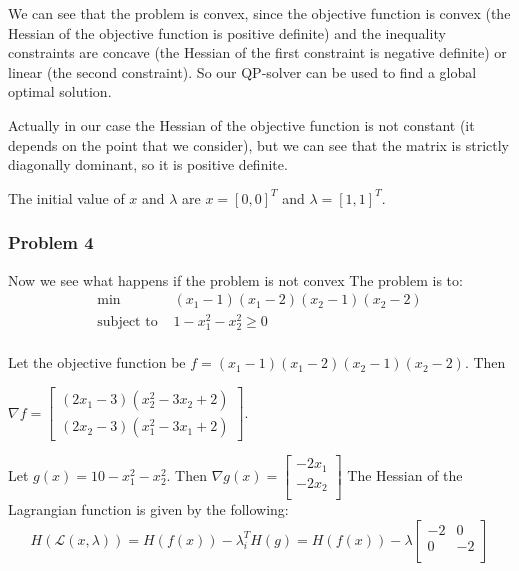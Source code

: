\documentclass{article}
\begin{document}
We can see that the problem is convex, since the objective function is convex (the Hessian of the objective function is positive definite) and the inequality constraints are concave (the Hessian of the first constraint is negative definite) or linear (the second constraint). So our QP-solver can be used to find a global optimal solution.

Actually in our case the Hessian of the objective function is not constant (it depends on the point that we consider), but we can see that the matrix is strictly diagonally dominant, so it is positive definite.

The initial value of  $x$ and $\lambda$ are $x = [0, 0]^T$ and $\lambda = [1, 1]^T$. 



\subsubsection{Problem 4}
Now we see what happens if the problem is not convex
The problem is to:
\begin{equation*}
\begin{aligned}
\textrm{min } & (x_1-1)(x_1-2)(x_2-1)(x_2-2) \\
\textrm{subject to } & 1-x_1^2-x_2^2 \geq 0 \\
\end{aligned}
\end{equation*}

Let the objective function be $f = (x_1-1)(x_1-2)(x_2-1)(x_2-2)$. Then

$\nabla f = \begin{bmatrix} (2x_1-3)(x_2^2-3x_2+2) \\ (2x_2-3)(x_1^2-3x_1+2) \end{bmatrix}$. 

Let $g(x) = 10-x_1^2-x_2^2 $. Then $\nabla g(x) = \begin{bmatrix} -2x_1\\ -2x_2\\ \end{bmatrix}$  The Hessian of the Lagrangian function is given by the following: 
\begin{equation*}
    H(\mathcal{L}(x, \lambda)) = H(f(x)) -  \lambda_i^T H(g) = H(f(x)) - \lambda \begin{bmatrix} -2 & 0\\ 0 & -2\\ \end{bmatrix}
\end{equation*}
\end{document}
